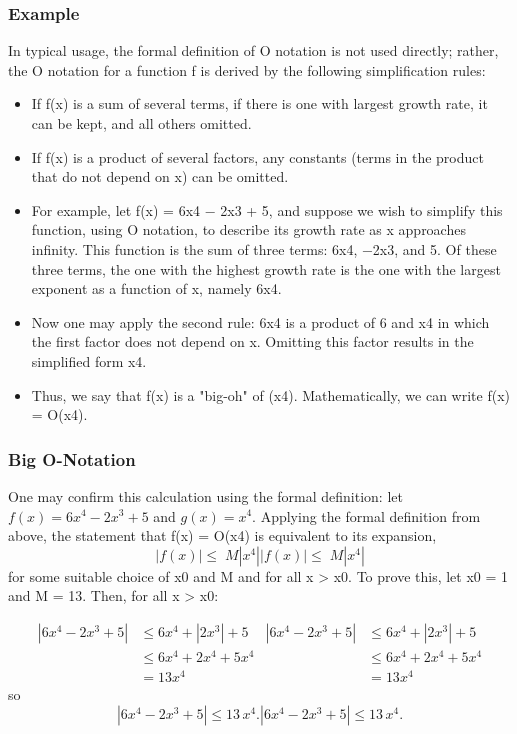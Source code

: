 \documentclass{beamer}
\begin{document}
\begin{frame}
\frametitle{Example}
In typical usage, the formal definition of O notation is not used directly; rather, the O notation for a function f is derived by the following simplification rules:
\begin{itemize}
\item If f(x) is a sum of several terms, if there is one with largest growth rate, it can be kept, and all others omitted.
\item If f(x) is a product of several factors, any constants (terms in the product that do not depend on x) can be omitted.
\end{itemize}
\end{frame}
\begin{frame}
\begin{itemize}
\item For example, let f(x) = 6x4 − 2x3 + 5, and suppose we wish to simplify this function, using O notation, to describe its growth rate as x approaches infinity. This function is the sum of three terms: 6x4, −2x3, and 5. Of these three terms, the one with the highest growth rate is the one with the largest exponent as a function of x, namely 6x4. 
\item Now one may apply the second rule: 6x4 is a product of 6 and x4 in which the first factor does not depend on x. Omitting this factor results in the simplified form x4. 
\item Thus, we say that f(x) is a "big-oh" of (x4). Mathematically, we can write f(x) = O(x4). 
\end{itemize}
\end{frame}
\begin{frame}
\frametitle{Big O-Notation}
One may confirm this calculation using the formal definition: let $f(x) = 6x^4 − 2x^3 + 5$ and $g(x) = x^4$. Applying the formal definition from above, the statement that f(x) = O(x4) is equivalent to its expansion,
\[
{\displaystyle |f(x)|\leq \;M|x^{4}|} {\displaystyle |f(x)|\leq \;M|x^{4}|}\]
for some suitable choice of x0 and M and for all x > x0. To prove this, let x0 = 1 and M = 13. Then, for all x > x0:

\[{\displaystyle {\begin{aligned}|6x^{4}-2x^{3}+5|&\leq 6x^{4}+|2x^{3}|+5\\&\leq 6x^{4}+2x^{4}+5x^{4}\\&=13x^{4}\end{aligned}}} {\displaystyle {\begin{aligned}|6x^{4}-2x^{3}+5|&\leq 6x^{4}+|2x^{3}|+5\\&\leq 6x^{4}+2x^{4}+5x^{4}\\&=13x^{4}\end{aligned}}}\]
so
\[
{\displaystyle |6x^{4}-2x^{3}+5|\leq 13\,x^{4}.} |6x^{4}-2x^{3}+5|\leq 13\,x^{4}.
\]
\end{frame}
\end{document}
